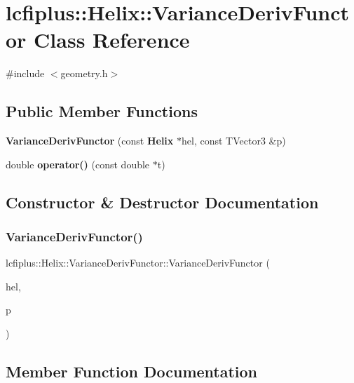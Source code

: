 \section{lcfiplus\+:\+:Helix\+:\+:Variance\+Deriv\+Functor Class Reference}
\label{classlcfiplus_1_1Helix_1_1VarianceDerivFunctor}


{\ttfamily \#include $<$geometry.\+h$>$}

\subsection*{Public Member Functions}
\begin{DoxyCompactItemize}
\item 
\textbf{ Variance\+Deriv\+Functor} (const \textbf{ Helix} $\ast$hel, const T\+Vector3 \&p)
\item 
double \textbf{ operator()} (const double $\ast$t)
\end{DoxyCompactItemize}


\subsection{Constructor \& Destructor Documentation}
\mbox{\label{classlcfiplus_1_1Helix_1_1VarianceDerivFunctor_a28f04c74141f0a19f88472b1aa13e17b}} 
\subsubsection{Variance\+Deriv\+Functor()}
{\footnotesize\ttfamily lcfiplus\+::\+Helix\+::\+Variance\+Deriv\+Functor\+::\+Variance\+Deriv\+Functor (\begin{DoxyParamCaption}\item[{const \textbf{ Helix} $\ast$}]{hel,  }\item[{const T\+Vector3 \&}]{p }\end{DoxyParamCaption})\hspace{0.3cm}{\ttfamily [inline]}}



\subsection{Member Function Documentation}
\mbox{\label{classlcfiplus_1_1Helix_1_1VarianceDerivFunctor_a78fefa4240ebabd76d444c1f3cdeb1d2}} 
